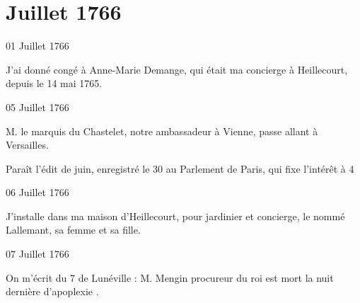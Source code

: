                   \chapter*{Juillet 1766}
                     
                     
                     

                     \begin{diary}{01 Juillet 1766}{}
                        
                         J'ai donné congé à Anne-Marie Demange,
                           qui était ma concierge à Heillecourt, depuis
                           le 14 mai 1765. \bigskip
        
        
                     \end{diary}

                     \begin{diary}{05 Juillet 1766}{}
                        
                        
                           M. le marquis du Chastelet,
                           notre ambassadeur
                           à Vienne, passe allant à
                              Versailles. \bigskip
        
        
                         Paraît l'édit de juin, enregistré
                           le 30 au Parlement de
                              Paris, qui fixe l'intérêt à 4 %
        
        
                     \end{diary}

                     \begin{diary}{06 Juillet 1766}{}
                        
                         J'installe dans ma maison d'Heillecourt, pour
                           jardinier et concierge, le nommé Lallemant, sa
                           femme et sa fille. \bigskip
        
        
                     \end{diary}

                     \begin{diary}{07 Juillet 1766}{}
                        
                         On m'écrit du 7 de Lunéville : \og M.
                                 Mengin
                              procureur du roi est mort la nuit dernière d'apoplexie \fg{}. \bigskip
        
        
                     \end{diary}

